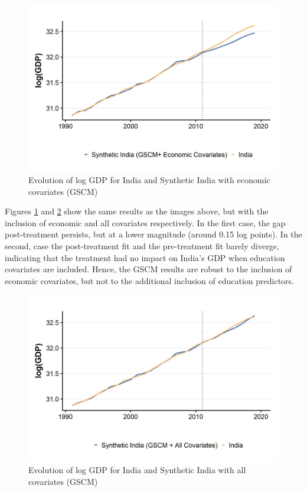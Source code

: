 \documentclass[12pt,nobind, a4paper]{reedthesis}
\begin{document}
 \begin{figure}

 {\centering \includegraphics[width=1\linewidth]{figure/indiagsynthc2} 

 }

 \caption{Evolution of log GDP for India and Synthetic India with economic covariates (GSCM)}\label{fig:indgsync1}
 \end{figure}
 Figures \ref{fig:indgsync1} and \ref{fig:indgsync2} show the same results as the images above, but with the inclusion of economic and all covariates respectively. In the first case, the gap post-treatment persists, but at a lower magnitude (around 0.15 log points). In the second, case the post-treatment fit and the pre-treatment fit barely diverge, indicating that the treatment had no impact on India's GDP when education covariates are included. Hence, the GSCM results are robust to the inclusion of economic covariates, but not to the additional inclusion of education predictors.
 \newpage
 \begin{figure}

 {\centering \includegraphics[width=1\linewidth]{figure/indiagsynthc1} 

 }

 \caption{Evolution of log GDP for India and Synthetic India with all covariates (GSCM)}\label{fig:indgsync2}
 \end{figure}
\end{document}
